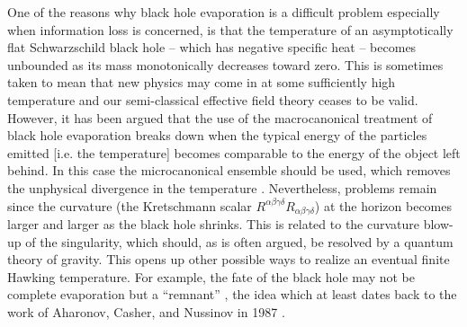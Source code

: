 \documentclass[12pt]{article}
\newcommand{\2}{$^2$}
\newcommand{\3}{$^3$}
\newcommand{\4}{$_4$}
\newcommand{\5}{$_5$}
\begin{document}
One of the reasons why black hole evaporation is a difficult problem especially when information loss is concerned, is that the temperature of an asymptotically flat Schwarzschild black hole -- which has negative specific heat -- becomes unbounded as its mass monotonically decreases toward zero. This is sometimes taken to mean that new physics may come in at some sufficiently high temperature and our semi-classical effective field theory ceases to be valid. However, it has been argued that the use of the macrocanonical treatment of black hole evaporation
breaks down when the typical energy of the particles emitted
[i.e. the temperature] becomes comparable to the energy of the
object left behind. In this case the microcanonical ensemble
should be used, which removes the unphysical divergence in the
temperature \cite{ham1,ham2,ham3, 0412265}. Nevertheless, problems remain since the curvature (the Kretschmann scalar $R^{\alpha\beta\gamma\delta}R_{\alpha\beta\gamma\delta}$) at the horizon becomes larger and larger as the black hole shrinks. This is related to the curvature blow-up of the singularity, which should, as is often argued, be resolved by a quantum theory of gravity.
This opens up other possible ways to realize an eventual finite Hawking temperature. For example, the fate of the black hole may not be complete evaporation but a ``remnant'' \cite{pisin}, the idea which at least dates back to the work of Aharonov, Casher, and Nussinov in 1987 \cite{ACN}. 
\end{document}
